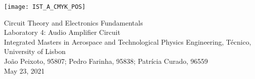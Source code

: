 
\thispagestyle {empty}

\texttt{[image: IST\_A\_CMYK\_POS]}


\begin{center}
\linespread{1.3}
%
\vspace{1.0cm}

\vspace{1cm}
{\FontLb Circuit Theory and Electronics Fundamentals} \\
\vspace{1cm}
{\FontLb Laboratory 4: Audio Amplifier Circuit} \\
\vspace{2cm}
{\FontSn Integrated Masters in Aerospace and Technological Physics Engineering, Técnico, University of Lisbon} \\ %
\vspace{1cm}
{\FontSn João Peixoto, 95807; Pedro Farinha, 95838; Patrícia Curado, 96559} \\
\vspace{1cm}
{\FontSn May 23, 2021} \\ %
\par
%
\end{center}


